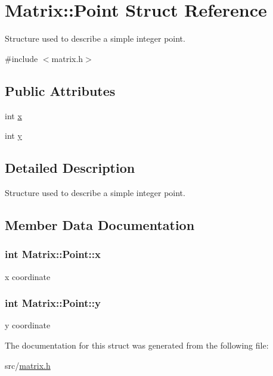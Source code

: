 \hypertarget{structMatrix_1_1Point}{
\section{Matrix::Point Struct Reference}
\label{structMatrix_1_1Point}
}


Structure used to describe a simple integer point.  




{\ttfamily \#include $<$matrix.h$>$}

\subsection*{Public Attributes}
\begin{DoxyCompactItemize}
\item 
int \hyperlink{structMatrix_1_1Point_a2b232ad12860c70ec725e7ddb3034a1e}{x}
\item 
int \hyperlink{structMatrix_1_1Point_aefcca947f63a8ed4d5de75b5e3ffd322}{y}
\end{DoxyCompactItemize}


\subsection{Detailed Description}
Structure used to describe a simple integer point. 

\subsection{Member Data Documentation}
\hypertarget{structMatrix_1_1Point_a2b232ad12860c70ec725e7ddb3034a1e}{
\subsubsection[{x}]{\setlength{\rightskip}{0pt plus 5cm}int {\bf Matrix::Point::x}}}
\label{structMatrix_1_1Point_a2b232ad12860c70ec725e7ddb3034a1e}
x coordinate \hypertarget{structMatrix_1_1Point_aefcca947f63a8ed4d5de75b5e3ffd322}{
\subsubsection[{y}]{\setlength{\rightskip}{0pt plus 5cm}int {\bf Matrix::Point::y}}}
\label{structMatrix_1_1Point_aefcca947f63a8ed4d5de75b5e3ffd322}
y coordinate 

The documentation for this struct was generated from the following file:\begin{DoxyCompactItemize}
\item 
src/\hyperlink{matrix_8h}{matrix.h}\end{DoxyCompactItemize}
